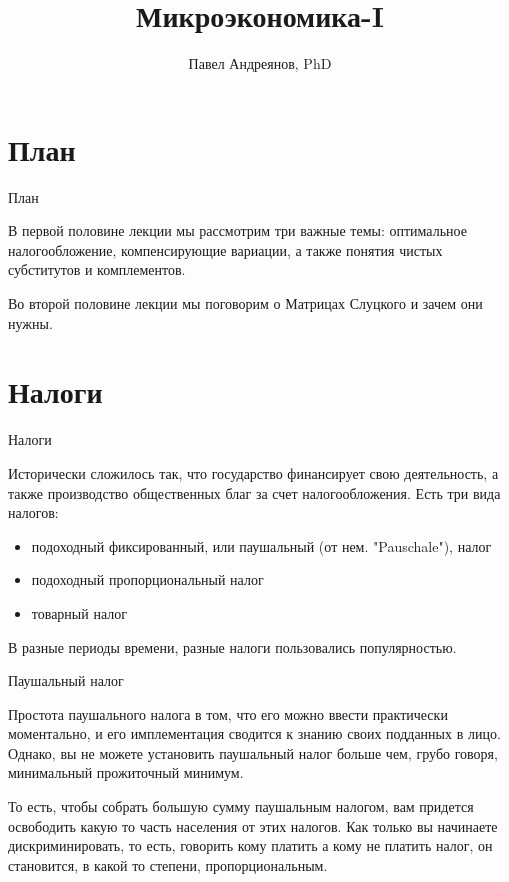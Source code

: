 \documentclass{beamer}
\title{
Микроэкономика-I
}
\author{
Павел Андреянов, PhD
}
\begin{document}
\maketitle

\section{План}

\begin{frame}{План}

В первой половине лекции мы рассмотрим три важные темы: оптимальное налогообложение, компенсирующие вариации, а также понятия чистых субститутов и комплементов.

Во второй половине лекции мы поговорим о Матрицах Слуцкого и зачем они нужны.

\end{frame}


\section{Налоги}

\begin{frame}{Налоги}

Исторически сложилось так, что государство финансирует свою деятельность, а также производство общественных благ за счет налогообложения. Есть три вида налогов:

\begin{itemize}
\item подоходный фиксированный, или паушальный (от нем. "Pauschale"), налог
\item подоходный пропорциональный налог
\item товарный налог

\end{itemize}

В разные периоды времени, разные налоги пользовались популярностью. 

\end{frame}

\begin{frame}{Паушальный налог}

Простота паушального налога в том, что его можно ввести практически моментально, и его имплементация сводится к знанию своих подданных в лицо. Однако, вы не можете установить паушальный налог больше чем, грубо говоря, минимальный прожиточный минимум. 

То есть, чтобы собрать большую сумму паушальным налогом, вам придется освободить какую то часть населения от этих налогов. Как только вы начинаете дискриминировать, то есть, говорить кому платить а кому не платить налог, он становится, в какой то степени, пропорциональным.

\end{frame}
\end{document}
